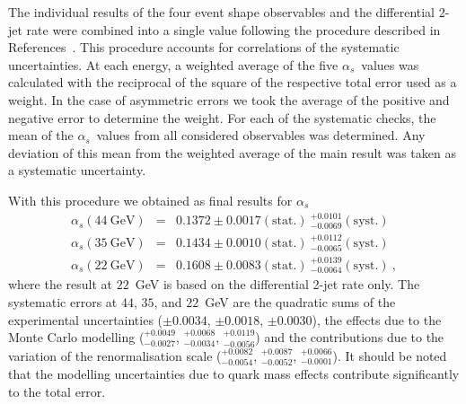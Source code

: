 \documentclass[12pt,a4paper,twoside]{article}
\newcommand{\as}     {\ensuremath{\alpha_s}}
\begin{document}
The individual results of the four event shape observables and the
differential 2-jet rate were combined into a single value following
the procedure described in 
References~\cite{bib-OPALresummed,bib-eventshapes,bib-globalalphas}.
This procedure accounts for correlations of the systematic uncertainties. %
At each energy, a weighted average of the five \as\ values was calculated
with the reciprocal of the square of the respective total error used
as a weight. 
In the case of asymmetric errors we took 
the average 
of the positive and negative error 
to determine the weight.
For each of the systematic checks, the mean of the \as\ values from all
considered observables was determined. 
Any deviation
of this mean from the weighted average of the main result was taken as
a  systematic uncertainty.

With this procedure we obtained as final results for \as
\begin{eqnarray*}
\as(44\ {\mathrm{GeV}}) & = & 0.1372 \pm 0.0017{\mathrm{(stat.)}}
                         \ ^{+0.0101}
                           _{-0.0069}{\mathrm{(syst.)}} \\
\as(35\ {\mathrm{GeV}}) & = & 0.1434 \pm 0.0010{\mathrm{(stat.)}}
                         \ ^{+0.0112}
                           _{-0.0065}{\mathrm{(syst.)}} \\
\as(22\ {\mathrm{GeV}}) & = & 0.1608 \pm 0.0083{\mathrm{(stat.)}}
                         \ ^{+0.0139} 
                           _{-0.0064}{\mathrm{(syst.)}}\ , 
\end{eqnarray*}
where the result at $22$~GeV is based on the differential 2-jet rate only.
The systematic errors at $44$, $35$, and $22$~GeV are 
the quadratic sums of
the experimental 
uncertainties ($\pm 0.0034$, $\pm 0.0018$, $\pm 0.0030$), the effects due
to the Monte Carlo modelling 
($^{+0.0049}_{-0.0027}$, $^{+0.0068}_{-0.0034}$, 
$^{+0.0119}_{-0.0056}$) 
and the contributions due to the variation of the renormalisation scale 
($^{+0.0082}_{-0.0054}$, $^{+0.0087}_{-0.0052}$, $^{+0.0066}_{-0.0001}$). 
It should be noted that the modelling uncertainties 
due to quark mass effects contribute significantly to the total error.
\end{document}
